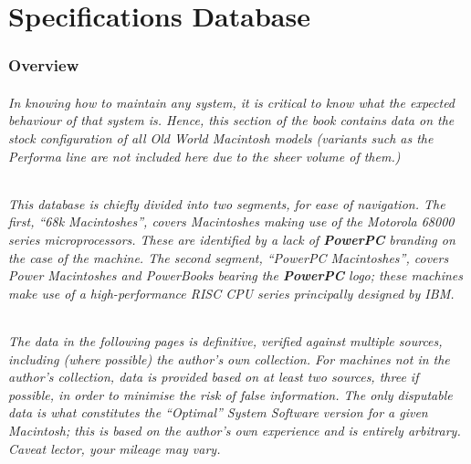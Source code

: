 
\part{Specifications Database}

\section{Overview}

\paragraph{%
In knowing how to maintain any system, it is critical to know what the expected %
behaviour of that system is. Hence, this section of the book contains data on the %
stock configuration of all Old World Macintosh models (variants such as the %
Performa line are not included here due to the sheer volume of them.) %
}

\paragraph{%
This database is chiefly divided into two segments, for ease of navigation. The %
first, ``68k Macintoshes'', covers Macintoshes making use of the Motorola 68000 %
series microprocessors. These are identified by a lack of \textsl{\textbf{\textrm{PowerPC}}} %
branding on the case of the machine. The second segment, ``PowerPC Macintoshes'', %
covers Power Macintoshes and PowerBooks bearing the \textsl{\textbf{\textrm{PowerPC}}} logo; %
these machines make use of a high-performance RISC CPU series principally designed by IBM. %
}

\paragraph{%
The data in the following pages is definitive, verified against multiple sources, including %
(where possible) the author's own collection. For machines not in the author's collection, %
data is provided based on at least two sources, three if possible, in order to minimise the %
risk of false information. The only disputable data is what constitutes the ``Optimal'' %
System Software version for a given Macintosh; this is based on the author's own %
experience and is entirely arbitrary. Caveat lector, your mileage may vary. %
}

\cleardoublepage


\cleardoublepage
